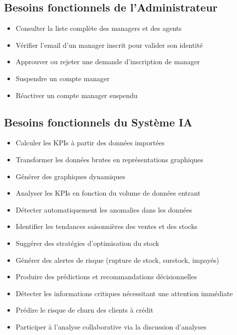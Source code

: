 \documentclass[a4paper,12pt]{report}
\begin{document}
\subsection{Besoins fonctionnels de l'Administrateur}

\begin{itemize}

\item Consulter la liste complète des managers et des agents
\item Vérifier l'email d'un manager inscrit pour valider son identité
\item Approuver ou rejeter une demande d'inscription de manager
\item Suspendre un compte manager
\item Réactiver un compte manager suspendu

\end{itemize}

\subsection{Besoins fonctionnels du Système IA}

\begin{itemize}

\item Calculer les KPIs à partir des données importées
\item Transformer les données brutes en représentations graphiques
\item Générer des graphiques dynamiques
\item Analyser les KPIs en fonction du volume de données entrant
\item Détecter automatiquement les anomalies dans les données
\item Identifier les tendances saisonnières des ventes et des stocks
\item Suggérer des stratégies d'optimisation du stock
\item Générer des alertes de risque (rupture de stock, surstock, impayés)
\item Produire des prédictions et recommandations décisionnelles
\item Détecter les informations critiques nécessitant une attention immédiate
\item Prédire le risque de churn des clients à crédit
\item Participer à l'analyse collaborative via la discussion d'analyses

\end{itemize}
\end{document}
